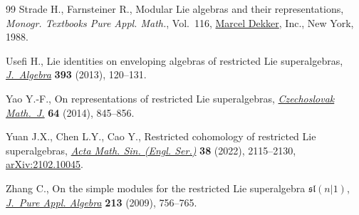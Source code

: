 \documentclass[10pt,a4paper]{amsart}
\numberwithin{equation}{section}
\begin{document}
\begin{thebibliography}{99}
Strade H., Farnsteiner R., Modular {L}ie algebras and their representations,
 \textit{Monogr. Textbooks Pure Appl. Math.}, Vol.~116, \href{https://doi.org/10.1201/9781003065630}{Marcel Dekker}, Inc.,
 New York, 1988.

Usefi H., Lie identities on enveloping algebras of restricted {L}ie
 superalgebras, \href{https://doi.org/10.1016/j.jalgebra.2013.06.026}{\textit{J.~Algebra}} \textbf{393} (2013), 120--131.

Yao Y.-F., On representations of restricted {L}ie superalgebras,
\href{https://doi.org/10.1007/s10587-014-0137-2}{\textit{Czechoslovak Math.~J.}} \textbf{64} (2014), 845--856.

Yuan J.X., Chen L.Y., Cao Y., Restricted cohomology of restricted {L}ie
 superalgebras, \href{https://doi.org/10.1007/s10114-022-1088-4}{\textit{Acta Math. Sin. (Engl. Ser.)}} \textbf{38} (2022),
 2115--2130, \href{https://arxiv.org/abs/2102.10045}{arXiv:2102.10045}.

Zhang C., On the simple modules for the restricted {L}ie superalgebra
 {${\mathfrak{sl}}(n|1)$}, \href{https://doi.org/10.1016/j.jpaa.2008.09.005}{\textit{J.~Pure Appl. Algebra}} \textbf{213} (2009),
 756--765.

\end{thebibliography}
\end{document}
